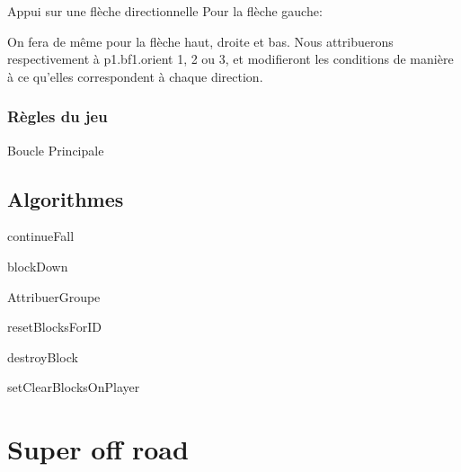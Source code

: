 \documentclass[10pt,dvipsnames,final]{beamer}
\begin{document}
\begin{frame}{Appui sur une flèche directionnelle}
Pour la flèche gauche:

On fera de même pour la flèche haut, droite et bas. Nous attribuerons respectivement à p1.bf1.orient 1, 2 ou 3, et modifieront les conditions de manière à ce qu'elles correspondent à chaque direction.
\end{frame}

\subsubsection{Règles du jeu}

\begin{frame}[allowframebreaks]{Boucle Principale}

\end{frame}

\subsection{Algorithmes}

\begin{frame}{continueFall}

\end{frame}

\begin{frame}{blockDown}

\end{frame}

\begin{frame}[allowframebreaks]{AttribuerGroupe}

\end{frame}

\begin{frame}{resetBlocksForID}

\end{frame}

\begin{frame}{destroyBlock}

\end{frame}

\begin{frame}{setClearBlocksOnPlayer}

\end{frame}

\section{Super off road}
\end{document}
